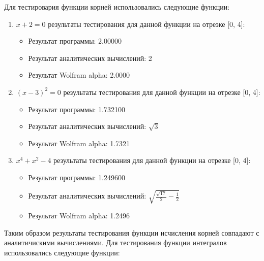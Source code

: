 \documentclass[a4paper,12pt,titlepage,finall]{article}
\begin{document}
\noindent Для тестировария функции корней использовались следующие функции:
\begin{enumerate}
  \item {$x+2=0$} результаты тестирования для данной функции на отрезке [0, 4]:
  \begin{itemize}
    \item Результат программы: 2.00000
    \item Результат аналитических вычислений: 2
    \item Результат Wolfram alpha: 2.0000
  \end{itemize}
  \item {$(x-3)^2=0$} результаты тестирования для данной функции на отрезке [0, 4]:
  \begin{itemize}
    \item Результат программы: 1.732100
    \item Результат аналитических вычислений: {$\sqrt{3}$}
    \item Результат Wolfram alpha: 1.7321
  \end{itemize}
\item {$x^4+x^2-4$} результаты тестирования для данной функции на отрезке [0, 4]:
  \begin{itemize}
    \item Результат программы: 1.249600
    \item Результат аналитических вычислений: {$\sqrt{\frac{\sqrt{17}}{2}-\frac{1}{2}}$}
    \item Результат Wolfram alpha: 1.2496
  \end{itemize}
\end{enumerate}
Таким образом результаты тестирования функции исчисления корней совпадают с аналитичискими вычислениями.
\newpage
\noindent Для тестирования функции интегралов использовались следующие функции:
\end{document}
